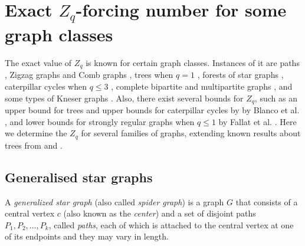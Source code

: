 \documentclass[11pt]{article}
\theoremstyle{plain}
\theoremstyle{definition}
\theoremstyle{remark}
\begin{document}
\section{Exact \texorpdfstring{\(Z_q\)}{Zq}-forcing number for some graph classes}\label{sec:exactvaluegraphclasses}


The exact value of $Z_q$ is known for certain graph classes. Instances of it are paths \cite{butler2020properties}, Zigzag graphs and Comb graphs \cite{butler2020properties}, trees when $q=1$ \cite{butler2020properties}, forests of star graphs \cite{blanco2023z_q}, caterpillar cycles when $q \leq 3$ \cite{blanco2023z_q}, complete bipartite and multipartite graphs \cite{fallat2024q}, and some types of Kneser graphs \cite{fallat2024q}. Also, there exist several bounds for $Z_q$, such as an upper bound for trees and upper bounds for caterpillar cycles by  by Blanco et al. \cite{blanco2023z_q}, and lower bounds for strongly regular graphs when $q \leq 1$ by Fallat et al. \cite{fallat2024q}. 
Here we determine the $Z_q$ for several families of graphs, extending known results about trees from \cite{blanco2023z_q} and \cite{butler2020properties}. 


 


 


\subsection{Generalised star graphs}

A \textit{generalized star graph} (also called \textit{spider graph}) is a graph $G$ that consists of a central vertex $c$ (also known as the \textit{center}) and a set of disjoint paths $P_1, P_2, \ldots, P_k$, called \textit{paths}, each of which is attached to the central vertex at one of its endpoints and they may vary in length.
\end{document}
